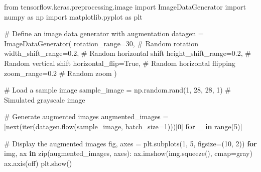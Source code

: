 \documentclass[
  letterpaper,
  DIV=11,
  numbers=noendperiod]{scrreprt}
\newenvironment{Shaded}{\begin{snugshade}}{\end{snugshade}}
\newcommand{\BuiltInTok}[1]{\textcolor[rgb]{0.00,0.23,0.31}{#1}}
\newcommand{\CommentTok}[1]{\textcolor[rgb]{0.37,0.37,0.37}{#1}}
\newcommand{\ControlFlowTok}[1]{\textcolor[rgb]{0.00,0.23,0.31}{\textbf{#1}}}
\newcommand{\DecValTok}[1]{\textcolor[rgb]{0.68,0.00,0.00}{#1}}
\newcommand{\FloatTok}[1]{\textcolor[rgb]{0.68,0.00,0.00}{#1}}
\newcommand{\ImportTok}[1]{\textcolor[rgb]{0.00,0.46,0.62}{#1}}
\newcommand{\KeywordTok}[1]{\textcolor[rgb]{0.00,0.23,0.31}{\textbf{#1}}}
\newcommand{\NormalTok}[1]{\textcolor[rgb]{0.00,0.23,0.31}{#1}}
\newcommand{\OperatorTok}[1]{\textcolor[rgb]{0.37,0.37,0.37}{#1}}
\newcommand{\StringTok}[1]{\textcolor[rgb]{0.13,0.47,0.30}{#1}}
\newcommand{\VariableTok}[1]{\textcolor[rgb]{0.07,0.07,0.07}{#1}}
\begin{document}
\begin{Shaded}
\begin{Highlighting}[]
\ImportTok{from}\NormalTok{ tensorflow.keras.preprocessing.image }\ImportTok{import}\NormalTok{ ImageDataGenerator}
\ImportTok{import}\NormalTok{ numpy }\ImportTok{as}\NormalTok{ np}
\ImportTok{import}\NormalTok{ matplotlib.pyplot }\ImportTok{as}\NormalTok{ plt}

\CommentTok{\# Define an image data generator with augmentation}
\NormalTok{datagen }\OperatorTok{=}\NormalTok{ ImageDataGenerator(}
\NormalTok{    rotation\_range}\OperatorTok{=}\DecValTok{30}\NormalTok{,  }\CommentTok{\# Random rotation}
\NormalTok{    width\_shift\_range}\OperatorTok{=}\FloatTok{0.2}\NormalTok{,  }\CommentTok{\# Random horizontal shift}
\NormalTok{    height\_shift\_range}\OperatorTok{=}\FloatTok{0.2}\NormalTok{,  }\CommentTok{\# Random vertical shift}
\NormalTok{    horizontal\_flip}\OperatorTok{=}\VariableTok{True}\NormalTok{,  }\CommentTok{\# Random horizontal flipping}
\NormalTok{    zoom\_range}\OperatorTok{=}\FloatTok{0.2}  \CommentTok{\# Random zoom}
\NormalTok{)}

\CommentTok{\# Load a sample image}
\NormalTok{sample\_image }\OperatorTok{=}\NormalTok{ np.random.rand(}\DecValTok{1}\NormalTok{, }\DecValTok{28}\NormalTok{, }\DecValTok{28}\NormalTok{, }\DecValTok{1}\NormalTok{)  }\CommentTok{\# Simulated grayscale image}

\CommentTok{\# Generate augmented images}
\NormalTok{augmented\_images }\OperatorTok{=}\NormalTok{ [}\BuiltInTok{next}\NormalTok{(}\BuiltInTok{iter}\NormalTok{(datagen.flow(sample\_image, batch\_size}\OperatorTok{=}\DecValTok{1}\NormalTok{)))[}\DecValTok{0}\NormalTok{] }\ControlFlowTok{for}\NormalTok{ \_ }\KeywordTok{in} \BuiltInTok{range}\NormalTok{(}\DecValTok{5}\NormalTok{)]}

\CommentTok{\# Display the augmented images}
\NormalTok{fig, axes }\OperatorTok{=}\NormalTok{ plt.subplots(}\DecValTok{1}\NormalTok{, }\DecValTok{5}\NormalTok{, figsize}\OperatorTok{=}\NormalTok{(}\DecValTok{10}\NormalTok{, }\DecValTok{2}\NormalTok{))}
\ControlFlowTok{for}\NormalTok{ img, ax }\KeywordTok{in} \BuiltInTok{zip}\NormalTok{(augmented\_images, axes):}
\NormalTok{    ax.imshow(img.squeeze(), cmap}\OperatorTok{=}\StringTok{\textquotesingle{}gray\textquotesingle{}}\NormalTok{)}
\NormalTok{    ax.axis(}\StringTok{\textquotesingle{}off\textquotesingle{}}\NormalTok{)}
\NormalTok{plt.show()}
\end{Highlighting}
\end{Shaded}
\end{document}
